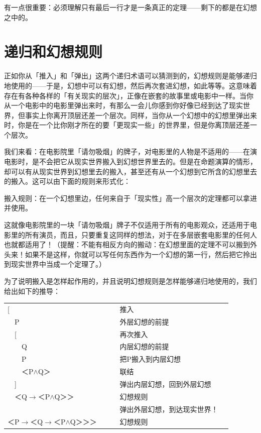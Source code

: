 \documentclass[
  12pt,
  twoside,
  openright,
  oldfontcommands,
]{memoir}
\begin{document}
有一点很重要：必须理解只有最后一行才是一条真正的定理------剩下的都是在幻想之中的。

\section{递归和幻想规则}

正如你从「推入」和「弹出」这两个递归术语可以猜测到的，幻想规则是能够递归地使用的------于是，幻想中可以有幻想，然后再次套进幻想，如此等等。这意味着存在有各种各样的「有关现实的层次」，正像在嵌套的故事里或电影中一样。当你从一个电影中的电影里弹出来时，有那么一会儿你感到你好像已经到达了现实世界，但事实上你离开顶层还差一个层次。同样，当你从一个幻想中的幻想里弹出来时，你是在一个比你刚才所在的要「更现实一些」的世界里，但是你离顶层还差一个层次。

我们来看：在电影院里「请勿吸烟」的牌子，对电影里的人物是不适用的------在演电影时，是不会把它从现实世界搬入到幻想世界里去的。但是在命题演算的情形，却可以有从现实世界到幻想里去的搬入，甚至还有从一个幻想到它所含的幻想里去的搬入。这可以由下面的规则来形式化：

搬入规则：在一个幻想里边，任何来自于「现实性」高一个层次的定理都可以拿进并使用。

这就像电影院里的一块「请勿吸烟」牌子不仅适用于所有的电影观众，还适用于电影里的所有演员，而且，只要重复这同样的想法，对于在多层嵌套电影里的任何人也就都适用了！（提醒：不能有相反方向的搬动：在幻想里面的定理不可以搬到外头来！如果不是这样，你就可以写任何东西作为一个幻想的第一行，然后把它拎出到现实世界中当成一个定理了。）

为了说明搬入是怎样起作用的，并且说明幻想规则是怎样能够递归地使用的，我们给出如下的推导：

\begin{longtable}[]{>{\raggedright\arraybackslash}p{0.47\linewidth} >{\raggedright\arraybackslash}p{0.47\linewidth}}
\toprule\noalign{}
\endhead
\bottomrule\noalign{}
\endlastfoot
{[} & 推入 \\
　P & 外层幻想的前提 \\
　{[} & 再次推入 \\
　　Q & 内层幻想的前提 \\
　　P & 把P搬入到内层幻想 \\
　　＜P$\wedge$Q＞ & 联结 \\
　{]} & 弹出内层幻想，回到外层幻想 \\
　＜Q$\rightarrow$＜P$\wedge$Q＞＞ & 幻想规则 \\
{]} & 弹出外层幻想，到达现实世界！ \\
＜P$\rightarrow$＜Q$\rightarrow$＜P$\wedge$Q＞＞＞ & 幻想规则 \\
\end{longtable}
\end{document}
